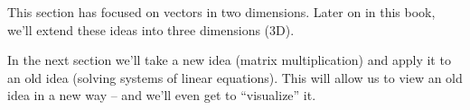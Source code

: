 This section has focused on vectors in two dimensions. Later on in this book, we'll extend these ideas into three dimensions (3D). 
%

In the next section we'll take a new idea (matrix multiplication) and apply it to an old idea (solving systems of linear equations). This will allow us to view an old idea in a new way -- and we'll even get to ``visualize'' it.\\

\clearpage

 
 

